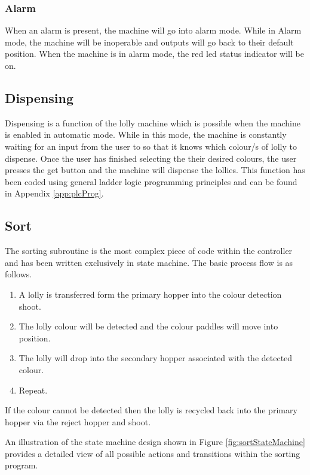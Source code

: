         \subsubsection{Alarm}
            When an alarm is present, the machine will go into alarm mode. While in Alarm mode, the machine will be inoperable and outputs will go back to their default position. When the machine is in alarm mode, the red \acrshort{led} status indicator will be on.

    \subsection{Dispensing}
        Dispensing is a function of the lolly machine which is possible when the machine is enabled in automatic mode. While in this mode, the machine is constantly waiting for an input from the user to so that it knows which colour/s of lolly to dispense. Once the user has finished selecting the their desired colours, the user presses the get button and the machine will dispense the lollies. This function has been coded using general ladder logic programming principles and can be found in Appendix \ref{app:plcProg}.
        
    \subsection{Sort}
        The sorting subroutine is the most complex piece of code within the controller and has been written exclusively in state machine. The basic process flow is as follows. 

        \begin{enumerate}
            \item A lolly is transferred form the primary hopper into the colour detection shoot.
            \item The lolly colour will be detected and the colour paddles will move into position.
            \item The lolly will drop into the secondary hopper associated with the detected colour.
            \item Repeat.
        \end{enumerate}

        If the colour cannot be detected then the lolly is recycled back into the primary hopper via the reject hopper and shoot. 

        An illustration of the state machine design shown in Figure \ref{fig:sortStateMachine} provides a detailed view of all possible actions and transitions within the sorting program.


